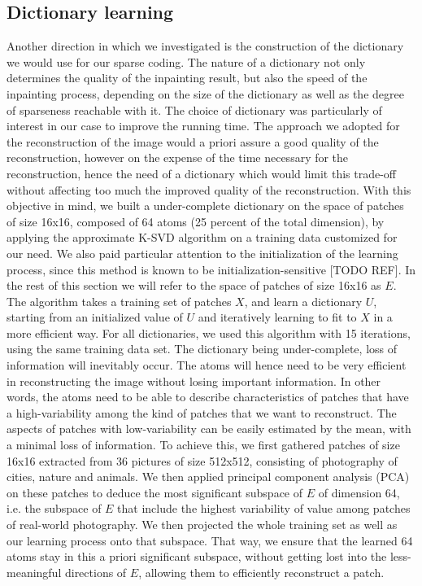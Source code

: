 \subsection{Dictionary learning}

Another direction in which we investigated is the construction of the dictionary we would use for our sparse coding. The nature of a dictionary not only determines the quality of the inpainting result, but also the speed of the inpainting process, depending on the size of the dictionary as well as the degree of sparseness reachable with it. 
The choice of dictionary was particularly of interest in our case to improve the running time. The approach we adopted for the reconstruction of the image would a priori assure a good quality of the reconstruction, however on the expense of the time necessary for the reconstruction, hence the need of a dictionary which would limit this trade-off without affecting too much the improved quality of the reconstruction.
With this objective in mind, we built a under-complete dictionary on the space of patches of size 16x16, composed of 64 atoms (25 percent of the total dimension), by applying the approximate K-SVD algorithm on a training data customized for our need. We also paid particular attention to the initialization of the learning process, since this method is known to be initialization-sensitive [TODO REF]. In the rest of this section we will refer to the space of patches of size 16x16 as $E$.
The algorithm takes a training set of patches $X$, and learn a dictionary $U$, starting from an initialized value of $U$ and iteratively learning to fit to $X$ in a more efficient way. 
For all dictionaries, we used this algorithm with 15 iterations, using the same training data set.
The dictionary being under-complete, loss of information will inevitably occur. The atoms will hence need to be very efficient in reconstructing the image without losing important information. In other words, the atoms need to be able to describe characteristics of patches that have a high-variability among the kind of patches that we want to reconstruct. The aspects of patches with low-variability can be easily estimated by the mean, with a minimal loss of information. 
To achieve this, we first gathered patches of size 16x16 extracted from 36 pictures of size 512x512, consisting of photography of cities, nature and animals. We then applied principal component analysis (PCA) on these patches to deduce the most significant subspace of $E$ of dimension 64, i.e. the subspace of $E$ that include the highest variability of value among patches of real-world photography. We then projected the whole training set as well as our learning process onto that subspace. That way, we ensure that the learned 64 atoms stay in this a priori significant subspace, without getting lost into the less-meaningful directions of $E$, allowing them to efficiently reconstruct a patch.

